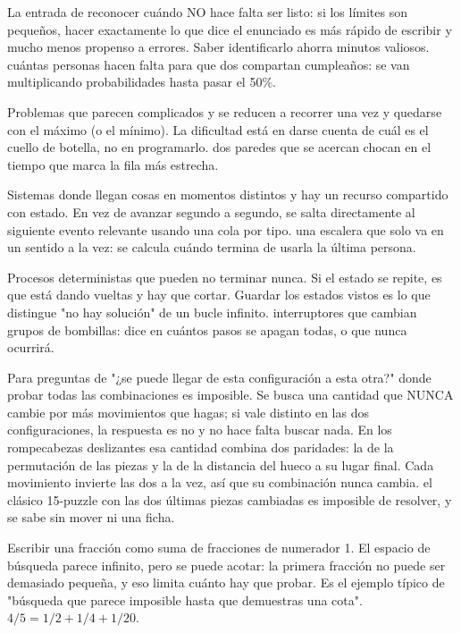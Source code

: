La entrada de reconocer cuándo NO hace falta ser listo: si los límites son
pequeños, hacer exactamente lo que dice el enunciado es más rápido de escribir y
mucho menos propenso a errores. Saber identificarlo ahorra minutos valiosos.
\ej cuántas personas hacen falta para que dos compartan cumpleaños: se van
multiplicando probabilidades hasta pasar el 50\%.

Problemas que parecen complicados y se reducen a recorrer una vez y quedarse con el
máximo (o el mínimo). La dificultad está en darse cuenta de cuál es el cuello de
botella, no en programarlo.
\ej dos paredes que se acercan chocan en el tiempo que marca la fila más
estrecha.

Sistemas donde llegan cosas en momentos distintos y hay un recurso compartido con
estado. En vez de avanzar segundo a segundo, se salta directamente al siguiente
evento relevante usando una cola por tipo.
\ej una escalera que solo va en un sentido a la vez: se calcula cuándo termina de
usarla la última persona.

Procesos deterministas que pueden no terminar nunca. Si el estado se repite, es que
está dando vueltas y hay que cortar. Guardar los estados vistos es lo que
distingue "no hay solución" de un bucle infinito.
\ej interruptores que cambian grupos de bombillas: dice en cuántos pasos se apagan
todas, o que nunca ocurrirá.

Para preguntas de "¿se puede llegar de esta configuración a esta otra?" donde
probar todas las combinaciones es imposible. Se busca una cantidad que NUNCA cambie
por más movimientos que hagas; si vale distinto en las dos configuraciones, la
respuesta es no y no hace falta buscar nada. En los rompecabezas deslizantes esa
cantidad combina dos paridades: la de la permutación de las piezas y la de la
distancia del hueco a su lugar final. Cada movimiento invierte las dos a la vez,
así que su combinación nunca cambia.
\ej el clásico 15-puzzle con las dos últimas piezas cambiadas es imposible de
resolver, y se sabe sin mover ni una ficha.

Escribir una fracción como suma de fracciones de numerador 1. El espacio de
búsqueda parece infinito, pero se puede acotar: la primera fracción no puede ser
demasiado pequeña, y eso limita cuánto hay que probar. Es el ejemplo típico de
"búsqueda que parece imposible hasta que demuestras una cota".
\ej $4/5 = 1/2 + 1/4 + 1/20$.

